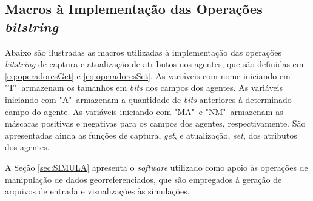 \subsection{Macros à Implementação das Operações \textit{bitstring}}

Abaixo são ilustradas as macros utilizadas à implementação das operações \textit{bitstring} de captura e atualização de atributos nos agentes, que são definidas em \ref{eq:operadoresGet} e \ref{eq:operadoresSet}. As variáveis com nome iniciando em "T"\ armazenam os tamanhos em \textit{bits} dos campos dos agentes. As variáveis iniciando com "A"\ armazenam a quantidade de \textit{bits} anteriores à determinado campo do agente. As variáveis iniciando com "MA"\ e "NM"\ armazenam as máscaras positivas e negativas para os campos dos agentes, respectivamente. São apresentadas ainda as funções de captura, \textit{get}, e atualização, \textit{set}, dos atributos dos agentes. 



A Seção \ref{sec:SIMULA} apresenta o \textit{software} utilizado como apoio às operações de manipulação de dados georreferenciados, que são empregados à geração de arquivos de entrada e visualizações às simulações.

\newpage